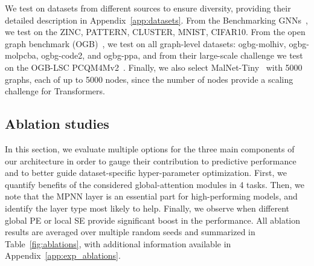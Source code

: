 \documentclass{article}
\begin{document}
We test on datasets from different sources to ensure diversity, providing their detailed description in Appendix~\ref{app:datasets}. From the Benchmarking GNNs~\cite{dwivedi2020benchmarking}, we test on the ZINC, PATTERN, CLUSTER, MNIST, CIFAR10. From the open graph benchmark (OGB)~\cite{hu2020ogb}, we test on all graph-level datasets: ogbg-molhiv, ogbg-molpcba, ogbg-code2, and ogbg-ppa, and from their large-scale challenge we test on the OGB-LSC PCQM4Mv2~\cite{hu2021ogblsc}. Finally, we also select MalNet-Tiny~\cite{freitas2021malnet} with 5000 graphs, each of up to 5000 nodes, since the number of nodes provide a scaling challenge for Transformers.

\subsection{Ablation studies}\label{sec:ablations}
In this section, we evaluate multiple options for the three main components of our architecture in order to gauge their contribution to predictive performance and to better guide dataset-specific hyper-parameter optimization. First, we quantify benefits of the considered global-attention modules in 4 tasks. Then, we note that the MPNN layer is an essential part for high-performing models, and identify the layer type most likely to help. Finally, we observe when different global PE or local SE provide significant boost in the performance.
All ablation results are averaged over multiple random seeds and summarized in Table~\ref{fig:ablations}, with additional information available in Appendix~\ref{app:exp_ablations}.
\end{document}
